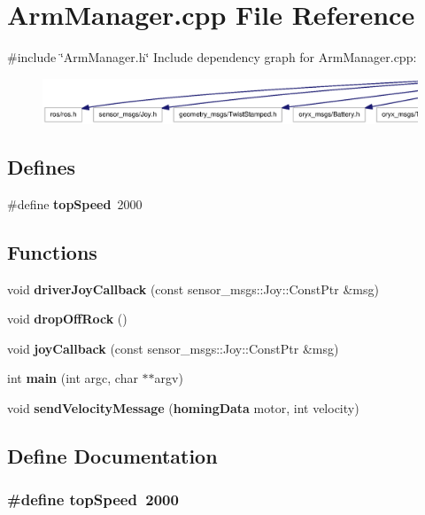 \section{\-Arm\-Manager.\-cpp \-File \-Reference}
\label{ArmManager_8cpp}
{\ttfamily \#include \char`\"{}\-Arm\-Manager.\-h\char`\"{}}\*
\-Include dependency graph for \-Arm\-Manager.\-cpp\-:
\nopagebreak
\begin{figure}[H]
\begin{center}
\leavevmode
\includegraphics[width=350pt]{ArmManager_8cpp__incl}
\end{center}
\end{figure}
\subsection*{\-Defines}
\begin{DoxyCompactItemize}
\item 
\#define {\bf top\-Speed}~2000
\end{DoxyCompactItemize}
\subsection*{\-Functions}
\begin{DoxyCompactItemize}
\item 
void {\bf driver\-Joy\-Callback} (const sensor\-\_\-msgs\-::\-Joy\-::\-Const\-Ptr \&msg)
\item 
void {\bf drop\-Off\-Rock} ()
\item 
void {\bf joy\-Callback} (const sensor\-\_\-msgs\-::\-Joy\-::\-Const\-Ptr \&msg)
\item 
int {\bf main} (int argc, char $\ast$$\ast$argv)
\item 
void {\bf send\-Velocity\-Message} ({\bf homing\-Data} motor, int velocity)
\end{DoxyCompactItemize}


\subsection{\-Define \-Documentation}
\subsubsection[{top\-Speed}]{\setlength{\rightskip}{0pt plus 5cm}\#define {\bf top\-Speed}~2000}\label{ArmManager_8cpp_a6f5c568363a0d2b0ad380dfd31d0f940}


